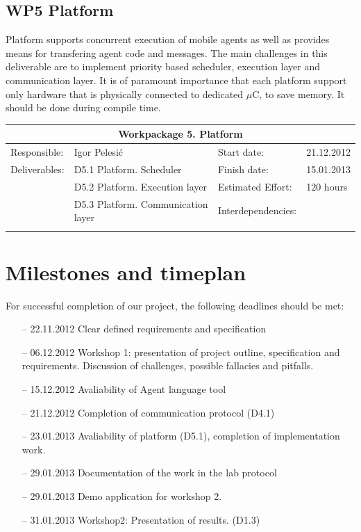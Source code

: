 \documentclass{scrreprt}
\begin{document}
	\subsection{WP5 Platform }

Platform supports concurrent execution of mobile agents as well as provides means for transfering
agent code and messages.
The main challenges in this deliverable are to implement priority based scheduler, 
execution layer and communication layer.
It is of paramount importance that each platform support only hardware that is physically connected 
to dedicated $\mu$C, to save memory. It should be done during compile time.

\vspace{0.2in}
\begin{tabular}{|ll|ll|}
\hline \multicolumn{4}{|c|}{\textbf{Workpackage 5. Platform }}\\
\hline
Responsible:	&  Igor Pelesi\'c			& Start date:		& 21.12.2012 \\
Deliverables:	&  D5.1 Platform. Scheduler		& Finish date:	 	& 15.01.2013\\
		&  D5.2 Platform. Execution layer	& Estimated Effort: 	& 120 hours \\
		&  D5.3 Platform. Communication layer	& Interdependencies:	& 	\\
		&  					& 			& 	\\
\hline
\end{tabular}


	\section{Milestones and timeplan}

For successful completion of our project, the following deadlines should be met:
\begin{itemize}

\item[--] 22.11.2012 Clear defined requirements and specification
\item[--]{ 06.12.2012 Workshop 1: presentation of project outline, specification and requirements.
	Discussion of challenges, possible fallacies and pitfalls.}
\item[--] 15.12.2012 Avaliability of Agent language tool
\item[--] 21.12.2012 Completion of communication protocol (D4.1)
\item[--] 23.01.2013 Avaliability of platform (D5.1), completion of implementation work.
\item[--] 29.01.2013 Documentation of the work in the lab protocol
\item[--] 29.01.2013 Demo application for workshop 2.
\item[--] 31.01.2013 Workshop2: Presentation of results. (D1.3)
\end{itemize}
\end{document}
